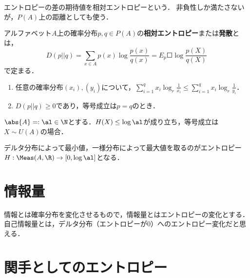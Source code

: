 \documentclass[uplatex,dvipdfmx]{jsreport}
\begin{document}
\begin{tcolorbox}[colframe=ForestGreen, colback=ForestGreen!10!white,breakable,colbacktitle=ForestGreen!40!white,coltitle=black,fonttitle=\bfseries\sffamily,
title=]
    エントロピーの差の期待値を相対エントロピーという．
    非負性しか満たさないが，$P(A)$上の距離としても使う．
\end{tcolorbox}

\begin{definition}
    アルファベット$A$上の確率分布$p,q\in P(A)$の\textbf{相対エントロピー}または\textbf{発散}とは，
    \[D(p||q)=\sum_{x\in A}p(x)\log\frac{p(x)}{q(x)}=E_p\Square{\log\frac{p(X)}{q(X)}}\]
    で定まる．
\end{definition}

\begin{proposition}[相対エントロピーの非負性]\mbox{}
    \begin{enumerate}
        \item 任意の確率分布$(x_i),(y_i)$について，$\sum^q_{i=1}x_i\log_r\frac{1}{x_i}\le\sum^q_{i=1}x_i\log_r\frac{1}{y_i}$．
        \item $D(p||q)\ge 0$であり，等号成立は$p=q$のとき．
    \end{enumerate}
\end{proposition}

\begin{proposition}[エントロピーの上限]
    $\abs{A}=:\al\in\N$とする．$H(X)\le\log\al$が成り立ち，等号成立は$X\sim U(A)$の場合．
\end{proposition}
\begin{remarks}
    デルタ分布によって最小値，一様分布によって最大値を取るのがエントロピー$H:\Meas(A,\R)\to[0,\log\al]$となる．
\end{remarks}

\section{情報量}

\begin{tcolorbox}[colframe=ForestGreen, colback=ForestGreen!10!white,breakable,colbacktitle=ForestGreen!40!white,coltitle=black,fonttitle=\bfseries\sffamily,
title=]
    情報とは確率分布を変化させるもので，情報量とはエントロピーの変化とする．
    自己情報量とは，デルタ分布（エントロピーが$0$）へのエントロピー変化だと思える．
\end{tcolorbox}

\section{関手としてのエントロピー}
\end{document}
